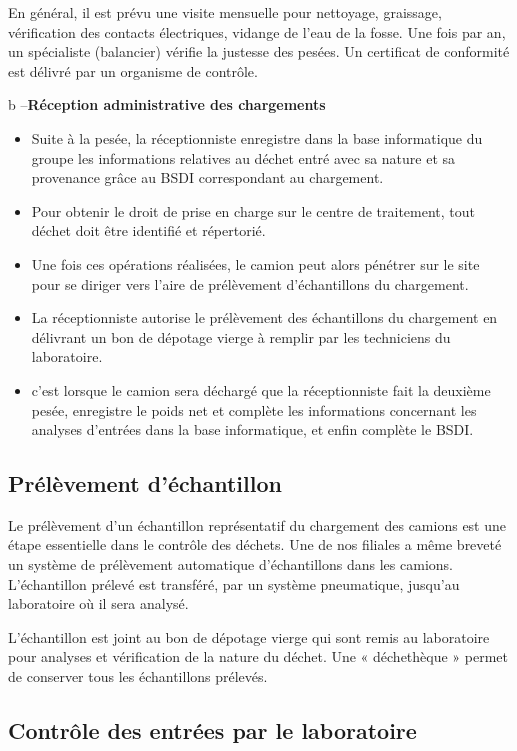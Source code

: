En général, il est prévu une visite mensuelle pour nettoyage, graissage, vérification des contacts électriques, vidange de l’eau de la fosse.
Une fois par an, un spécialiste (balancier) vérifie la justesse des pesées. Un certificat de conformité est délivré par un organisme de contrôle.

b –\textbf{Réception administrative des chargements}

\begin{itemize}
\item Suite à la pesée, la réceptionniste enregistre dans la base informatique du groupe les informations relatives au déchet entré avec sa nature et sa provenance grâce au BSDI correspondant au chargement.
\item Pour obtenir le droit de prise en charge sur le centre de traitement, tout déchet doit être identifié et répertorié.
\item Une fois ces opérations réalisées, le camion peut alors pénétrer sur le site pour se diriger vers l’aire de prélèvement d’échantillons du chargement.
\item La réceptionniste autorise le prélèvement des échantillons du chargement en délivrant un bon de dépotage vierge à remplir par les techniciens du laboratoire.
\item c’est lorsque le camion sera déchargé que la réceptionniste fait la deuxième pesée, enregistre le poids net et complète les informations concernant les analyses d’entrées dans la base informatique, et enfin complète le BSDI.
\end{itemize}


\subsection{Prélèvement d’échantillon}

Le prélèvement d’un échantillon représentatif du chargement des camions est une étape essentielle dans le contrôle des déchets.
Une de nos filiales a même breveté un système de prélèvement automatique d’échantillons dans les camions.
L’échantillon prélevé est transféré, par un système pneumatique, jusqu’au laboratoire où il sera analysé.
\vspace{0.3cm}

L’échantillon est joint au bon de dépotage vierge qui sont remis au laboratoire pour analyses et vérification de la nature du déchet.
Une « déchethèque » permet de conserver tous les échantillons prélevés.


\subsection{Contrôle des entrées par le laboratoire}

